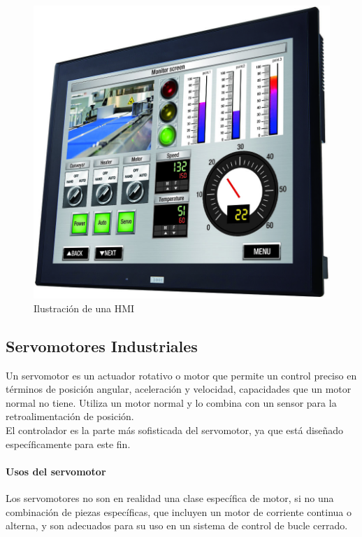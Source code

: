 \documentclass[12pt,titlepage]{article}
\begin{document}
\begin{figure}[htbp]
\hspace*{4.5cm} 
\includegraphics[scale=1.30]{HMI}
\caption{Ilustración de una HMI}
\end{figure}
\newpage

\subsection{Servomotores Industriales}
Un servomotor es un actuador rotativo o motor que permite un control preciso en términos de posición angular, aceleración y velocidad, capacidades que un motor normal no tiene. Utiliza un  motor normal y lo combina con un sensor para la retroalimentación de posición. \\

El controlador es la parte más sofisticada del servomotor, ya que está diseñado específicamente para este fin. \\ 

\paragraph{Usos del servomotor}\leavevmode\newline
Los servomotores no son en realidad una clase específica de motor, si no una combinación de piezas específicas, que incluyen un motor de corriente continua o alterna, y son adecuados para su uso en un sistema de control de bucle cerrado. \\
\end{document}
